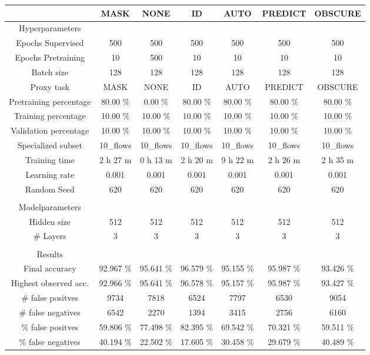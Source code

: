 \begin{table}[htb]
    \centering
    \begin{tabular}{@{}ccccccc@{}}
        \toprule
         &  MASK &  NONE &  ID &  AUTO &  PREDICT &  OBSCURE \\
        \midrule
        Hyperparameters &  &  &  &  &  &  \\
        Epochs Supervised &  500 &  500 &  500 &  500 &  500 &  500 \\
        Epochs Pretraining &  10 &  500 &  10 &  10 &  10 &  10 \\
        Batch size &  128 &  128 &  128 &  128 &  128 &  128 \\
        Proxy task &  MASK &  NONE &  ID &  AUTO &  PREDICT &  OBSCURE \\
        Pretraining percentage &  80.00 \% &  0.00 \% &  80.00 \% &  80.00 \% &  80.00 \% &  80.00 \% \\
        Training percentage &  10.00 \% &  10.00 \% &  10.00 \% &  10.00 \% &  10.00 \% &  10.00 \% \\
        Validation percentage &  10.00 \% &  10.00 \% &  10.00 \% &  10.00 \% &  10.00 \% &  10.00 \% \\
        Specialized subset &  10\_flows &  10\_flows &  10\_flows &  10\_flows &  10\_flows &  10\_flows \\
        Training time &  2 h 27 m &  0 h 13 m &  2 h 20 m &  9 h 22 m &  2 h 26 m &  2 h 35 m \\
        Learning rate &  0.001 &  0.001 &  0.001 &  0.001 &  0.001 &  0.001 \\
        Random Seed &  620 &  620 &  620 &  620 &  620 &  620 \\
         \\
        Modelparameters &  &  &  &  &  &  \\
        Hidden size &  512 &  512 &  512 &  512 &  512 &  512 \\
        \# Layers &  3 &  3 &  3 &  3 &  3 &  3 \\
         \\
        Results &  &  &  &  &  &  \\
        Final accuracy &  92.967 \% &  95.641 \% &  96.579 \% &  95.155 \% &  95.987 \% &  93.426 \% \\
        Highest observed acc. &  92.966 \% &  95.641 \% &  96.578 \% &  95.157 \% &  95.987 \% &  93.427 \% \\
        \# false positves &  9734 &  7818 &  6524 &  7797 &  6530 &  9054 \\
        \# false negatives &  6542 &  2270 &  1394 &  3415 &  2756 &  6160 \\
        \% false positves &  59.806 \% &  77.498 \% &  82.395 \% &  69.542 \% &  70.321 \% &  59.511 \% \\
        \% false negatives &  40.194 \% &  22.502 \% &  17.605 \% &  30.458 \% &  29.679 \% &  40.489 \% \\
        \bottomrule
    \end{tabular}
\end{table}
